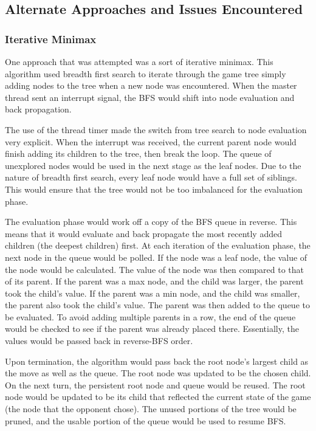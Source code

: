 \documentclass[]{article}
\begin{document}
\subsection{Alternate Approaches and Issues Encountered}
\subsubsection{Iterative Minimax}
One approach that was attempted was a sort of iterative minimax. This algorithm used breadth first search to iterate through the game tree simply adding nodes to the tree when a new node was encountered. When the master thread sent an interrupt signal, the BFS would shift into node evaluation and back propagation. 

The use of the thread timer made the switch from tree search to node evaluation very explicit. When the interrupt was received, the current parent node would finish adding its children to the tree, then break the loop. The queue of unexplored nodes would be used in the next stage as the leaf nodes. Due to the nature of breadth first search, every leaf node would have a full set of siblings. This would ensure that the tree would not be too imbalanced for the evaluation phase.

The evaluation phase would work off a copy of the BFS queue in reverse. This means that it would evaluate and back propagate the most recently added children (the deepest children) first. At each iteration of the evaluation phase, the next node in the queue would be polled. If the node was a leaf node, the value of the node would be calculated. The value of the node was then compared to that of its parent. If the parent was a max node, and the child was larger, the parent took the child's value. If the parent was a min node, and the child was smaller, the parent also took the child's value. The parent was then added to the queue to be evaluated. To avoid adding multiple parents in a row, the end of the queue would be checked to see if the parent was already placed there. Essentially, the values would be passed back in reverse-BFS order. 

Upon termination, the algorithm would pass back the root node's largest child as the move as well as the queue. The root node was updated to be the chosen child. On the next turn, the persistent root node and queue would be reused. The root node would be updated to be its child that reflected the current state of the game (the node that the opponent chose). The unused portions of the tree would be pruned, and the usable portion of the queue would be used to resume BFS. 
\end{document}
